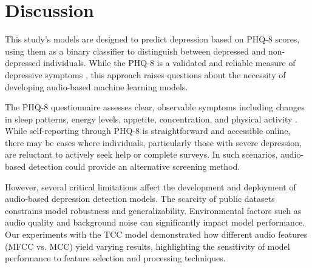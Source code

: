 

\section{Discussion}

This study's models are designed to predict depression based on PHQ-8 scores, using them as a binary classifier to distinguish between depressed and non-depressed individuals. While the PHQ-8 is a validated and reliable measure of depressive symptoms \cite{phq8}, this approach raises questions about the necessity of developing audio-based machine learning models.

The PHQ-8 questionnaire assesses clear, observable symptoms including changes in sleep patterns, energy levels, appetite, concentration, and physical activity \cite{phq8qu}. While self-reporting through PHQ-8 is straightforward and accessible online, there may be cases where individuals, particularly those with severe depression, are reluctant to actively seek help or complete surveys. In such scenarios, audio-based detection could provide an alternative screening method.

However, several critical limitations affect the development and deployment of audio-based depression detection models. The scarcity of public datasets constrains model robustness and generalizability. Environmental factors such as audio quality and background noise can significantly impact model performance. Our experiments with the TCC model demonstrated how different audio features (MFCC vs. MCC) yield varying results, highlighting the sensitivity of model performance to feature selection and processing techniques.

